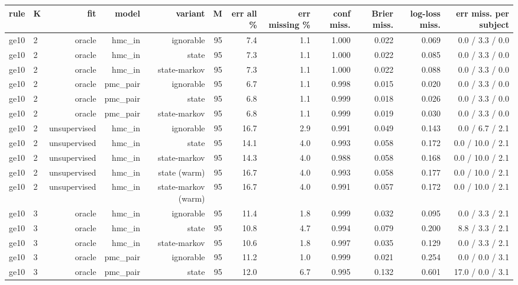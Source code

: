 \begin{table}[ht]
\centering
\small
\begin{tabular}{llrrrrrrrrrr}
\toprule
rule & K & fit & model & variant & M & err all \% & err missing \% & conf miss. & Brier miss. & log-loss miss. & err miss. per subject \\
\midrule
ge10 & 2 & oracle & hmc\_in & ignorable & 95 & 7.4 & 1.1 & 1.000 & 0.022 & 0.069 & 0.0 / 3.3 / 0.0 \\
ge10 & 2 & oracle & hmc\_in & state & 95 & 7.3 & 1.1 & 1.000 & 0.022 & 0.085 & 0.0 / 3.3 / 0.0 \\
ge10 & 2 & oracle & hmc\_in & state-markov & 95 & 7.3 & 1.1 & 1.000 & 0.022 & 0.088 & 0.0 / 3.3 / 0.0 \\
ge10 & 2 & oracle & pmc\_pair & ignorable & 95 & 6.7 & 1.1 & 0.998 & 0.015 & 0.020 & 0.0 / 3.3 / 0.0 \\
ge10 & 2 & oracle & pmc\_pair & state & 95 & 6.8 & 1.1 & 0.999 & 0.018 & 0.026 & 0.0 / 3.3 / 0.0 \\
ge10 & 2 & oracle & pmc\_pair & state-markov & 95 & 6.8 & 1.1 & 0.999 & 0.019 & 0.030 & 0.0 / 3.3 / 0.0 \\
ge10 & 2 & unsupervised & hmc\_in & ignorable & 95 & 16.7 & 2.9 & 0.991 & 0.049 & 0.143 & 0.0 / 6.7 / 2.1 \\
ge10 & 2 & unsupervised & hmc\_in & state & 95 & 14.1 & 4.0 & 0.993 & 0.058 & 0.172 & 0.0 / 10.0 / 2.1 \\
ge10 & 2 & unsupervised & hmc\_in & state-markov & 95 & 14.3 & 4.0 & 0.988 & 0.058 & 0.168 & 0.0 / 10.0 / 2.1 \\
ge10 & 2 & unsupervised & hmc\_in & state (warm) & 95 & 16.7 & 4.0 & 0.993 & 0.058 & 0.177 & 0.0 / 10.0 / 2.1 \\
ge10 & 2 & unsupervised & hmc\_in & state-markov (warm) & 95 & 16.7 & 4.0 & 0.991 & 0.057 & 0.172 & 0.0 / 10.0 / 2.1 \\
ge10 & 3 & oracle & hmc\_in & ignorable & 95 & 11.4 & 1.8 & 0.999 & 0.032 & 0.095 & 0.0 / 3.3 / 2.1 \\
ge10 & 3 & oracle & hmc\_in & state & 95 & 10.8 & 4.7 & 0.994 & 0.079 & 0.200 & 8.8 / 3.3 / 2.1 \\
ge10 & 3 & oracle & hmc\_in & state-markov & 95 & 10.6 & 1.8 & 0.997 & 0.035 & 0.129 & 0.0 / 3.3 / 2.1 \\
ge10 & 3 & oracle & pmc\_pair & ignorable & 95 & 11.2 & 1.0 & 0.999 & 0.021 & 0.254 & 0.0 / 0.0 / 3.1 \\
ge10 & 3 & oracle & pmc\_pair & state & 95 & 12.0 & 6.7 & 0.995 & 0.132 & 0.601 & 17.0 / 0.0 / 3.1 \\

\end{tabular}
\end{table}

